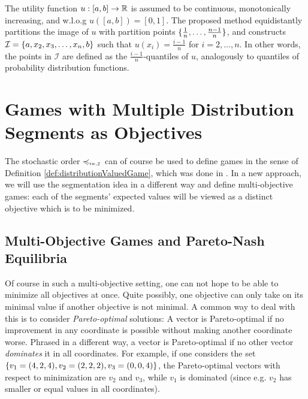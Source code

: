 \documentclass[a4paper]{scrreprt}
\begin{document}
    The utility function $u: [a, b] \to \mathbb{R}$ is assumed to be continuous, monotonically increasing, and w.l.o.g $u([a, b]) = [0, 1]$.
    The proposed method equidistantly partitions the image of $u$ with partition points $\{\frac{1}{n}, \dots, \frac{n-1}{n}\}$, and constructs $\mathcal{I} = \{a, x_2, x_3, \dots, x_n, b\}$ such that $u(x_i) = \frac{i-1}{n}$ for $i = 2, \dots, n$.
    In other words, the points in $\mathcal{I}$ are defined as the $\frac{i-1}{n}$-quantiles of $u$, analogously to quantiles of probability distribution functions.
    
    \section{Games with Multiple Distribution Segments as Objectives}
    The stochastic order $\leqtw$ can of course be used to define games in the sense of Definition \ref{def:distributionValuedGame}, which was done in \cite{bib:tweakableStochasticOrders}.
    In a new approach, we will use the segmentation idea in a different way and define multi-objective games: each of the segments' expected values will be viewed as a distinct objective which is to be minimized.
    
    \subsection{Multi-Objective Games and Pareto-Nash Equilibria}
    Of course in such a multi-objective setting, one can not hope to be able to minimize all objectives at once. Quite possibly, one objective can only take on its minimal value if another objective is not minimal. A common way to deal with this is to consider \emph{Pareto-optimal} solutions:
    A vector is Pareto-optimal if no improvement in any coordinate is possible without making another coordinate worse. Phrased in a different way, a vector is Pareto-optimal if no other vector \emph{dominates} it in all coordinates.
    For example, if one considers the set $\{v_1 = (4, 2, 4), v_2 = (2, 2, 2), v_3 = (0, 0, 4)\}$, the Pareto-optimal vectors with respect to minimization are $v_2$ and $v_3$, while $v_1$ is dominated (since e.g. $v_2$ has smaller or equal values in all coordinates).
    
\end{document}
